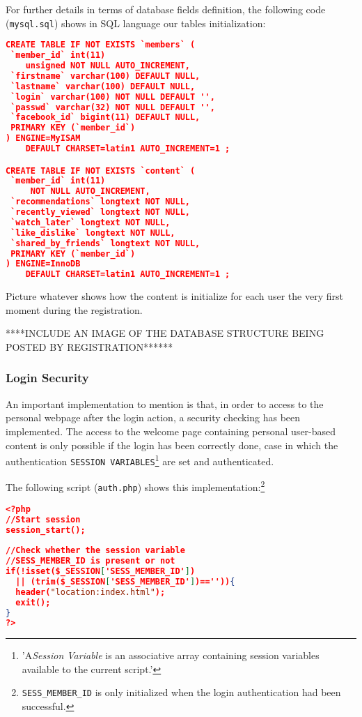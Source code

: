 \documentclass{acm_proc_article-sp}
\begin{document}
For further details in terms of database fields definition, the following code (\texttt{mysql.sql}) shows in SQL language our tables initialization: 

\begin{lstlisting}[language=json,firstnumber=1]
CREATE TABLE IF NOT EXISTS `members` (
 `member_id` int(11) 
    unsigned NOT NULL AUTO_INCREMENT,
 `firstname` varchar(100) DEFAULT NULL,
 `lastname` varchar(100) DEFAULT NULL,
 `login` varchar(100) NOT NULL DEFAULT '',
 `passwd` varchar(32) NOT NULL DEFAULT '',
 `facebook_id` bigint(11) DEFAULT NULL,
 PRIMARY KEY (`member_id`)
) ENGINE=MyISAM  
    DEFAULT CHARSET=latin1 AUTO_INCREMENT=1 ;

CREATE TABLE IF NOT EXISTS `content` (
 `member_id` int(11) 
     NOT NULL AUTO_INCREMENT,
 `recommendations` longtext NOT NULL,
 `recently_viewed` longtext NOT NULL,
 `watch_later` longtext NOT NULL,
 `like_dislike` longtext NOT NULL,
 `shared_by_friends` longtext NOT NULL,
 PRIMARY KEY (`member_id`)
) ENGINE=InnoDB  
    DEFAULT CHARSET=latin1 AUTO_INCREMENT=1 ;
\end{lstlisting}

Picture whatever shows how the content is initialize for each user the very first moment during the registration. 

****INCLUDE AN IMAGE OF THE DATABASE STRUCTURE BEING POSTED BY REGISTRATION******

\subsubsection{Login Security}

An important implementation to mention is that, in order to access to the personal webpage after the login action, a security checking has been implemented. The access to the welcome page containing personal user-based content is only possible if the login has been correctly done, case in which the authentication \texttt{SESSION VARIABLES}\cite{php:session}\footnote{'A\textit{Session Variable} is an associative array containing session variables available to the current script.'} are set and authenticated. 

The following script (\texttt{auth.php}) shows this implementation:\footnote{\texttt{SESS\_MEMBER\_ID} is only initialized when the login authentication had been successful.}

\begin{lstlisting}[language=json,firstnumber=1]
<?php
//Start session
session_start();
	
//Check whether the session variable 
//SESS_MEMBER_ID is present or not
if(!isset($_SESSION['SESS_MEMBER_ID']) 
  || (trim($_SESSION['SESS_MEMBER_ID'])=='')){
  header("location:index.html");
  exit();
}
?>
\end{lstlisting}
\end{document}
